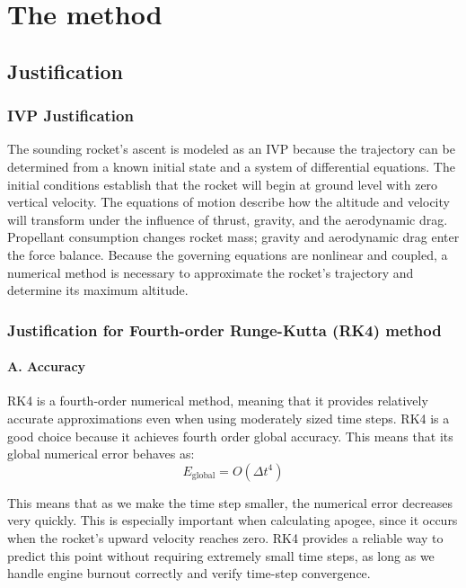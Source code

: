 \documentclass{article}
\begin{document}

\section{The method}

\subsection{Justification} %

\subsubsection{IVP Justification}
The sounding rocket's ascent is modeled as an IVP because the trajectory can be determined from a known initial state and a system of differential equations. The initial conditions establish that the rocket will begin at ground level with zero vertical velocity. The equations of motion describe how the altitude and velocity will transform under the influence of thrust, gravity, and the aerodynamic drag. Propellant consumption changes rocket mass; gravity and aerodynamic drag enter the force balance. Because the governing equations are nonlinear and coupled, a numerical method is necessary to approximate the rocket's trajectory and determine its maximum altitude. 

\subsubsection{Justification for Fourth-order Runge-Kutta (RK4) method}

\paragraph{A. Accuracy}


RK4 is a fourth-order numerical method, meaning that it provides relatively accurate approximations even when using moderately sized time steps. 
RK4 is a good choice because it achieves fourth order global accuracy. This means that its global numerical error behaves as: 
\[\boxed{E_{\text{global}} = O(\Delta t^4)}\]

This means that as we make the time step smaller, the numerical error decreases very quickly. 
This is especially important when calculating apogee, since it occurs when the rocket's upward velocity reaches zero. RK4 provides a reliable way to predict this point without requiring extremely small time steps, as long as we handle engine burnout correctly and verify time-step convergence. 
\end{document}
